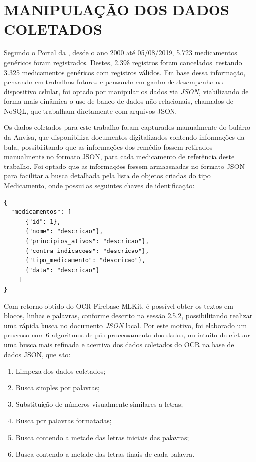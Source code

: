 \section{MANIPULAÇÃO DOS DADOS COLETADOS}

Segundo o Portal da , desde o ano 2000 até 05/08/2019, 5.723 medicamentos genéricos foram registrados. Destes, 2.398 registros foram cancelados, restando 3.325 medicamentos genéricos com registros válidos. Em base dessa informação, pensando em trabalhos futuros e pensando em ganho de desempenho no dispositivo celular, foi optado por manipular os dados via \textit{JSON}, viabilizando de forma mais dinâmica o uso de banco de dados não relacionais, chamados de NoSQL, que trabalham diretamente com arquivos JSON.

Os dados coletados para este trabalho foram capturados manualmente do bulário da Anvisa, que disponibiliza documentos digitalizados contendo informações da bula, possibilitando que as informações dos remédio fossem retirados manualmente no formato JSON, para cada medicamento de referência deste trabalho. Foi optado que as informações fossem armazenadas no formato JSON para facilitar a busca detalhada pela lista de objetos criadas do tipo Medicamento, onde possui as seguintes chaves de identificação:

\begin{lstlisting}[firstnumber=1]
{
  "medicamentos": [
      {"id": 1},
      {"nome": "descricao"},
      {"principios_ativos": "descricao"},
      {"contra_indicacoes": "descricao"},
      {"tipo_medicamento": "descricao"},
      {"data": "descricao"}
    ]
}
\end{lstlisting}


Com retorno obtido do OCR Firebase MLKit, é possível obter os textos em blocos, linhas e palavras, conforme descrito na sessão 2.5.2, possibilitando realizar uma rápida busca no documento \textit{JSON} local. Por este motivo, foi elaborado um processo com 6 algoritmos de pós processamento dos dados, no intuito de efetuar uma busca mais refinada e acertiva dos dados coletados do OCR na base de dados JSON, que são:

\begin{enumerate}
  \item Limpeza dos dados coletados;
  \item Busca simples por palavras;
  \item Substituição de números visualmente similares a letras;
  \item Busca por palavras formatadas;
  \item Busca contendo a metade das letras iniciais das palavras;
  \item Busca contendo a metade das letras finais de cada palavra.
\end{enumerate}

